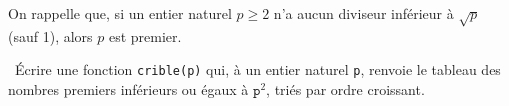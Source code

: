 \exer{}
\setcounter{numques}{0}

On rappelle que, si un entier naturel $p \geq 2$ n'a aucun diviseur inférieur à $\sqrt{p}$ (sauf 1), alors $p$ est premier.


\question\ \'Ecrire une fonction \texttt{crible(p)} qui, à un entier naturel \texttt{p}, renvoie le tableau des nombres premiers inférieurs ou égaux à $\texttt{p}^2$, triés par ordre croissant.